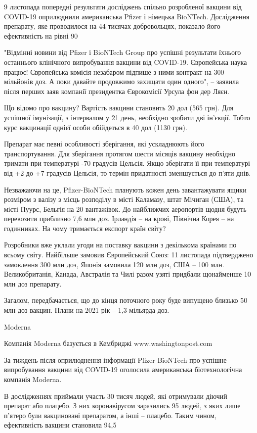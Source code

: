 9 листопада попередні результати досліджень спільно розробленої вакцини від COVID-19 оприлюднили американська Pfizer і німецька BioNTech. Дослідження препарату, яке проводилося на 44 тисячах добровольцях, показало його ефективність на рівні 90%

"Відмінні новини від Pfizer і BioNTech Group про успішні результати їхнього останнього клінічного випробування вакцини від COVID-19. Європейська наука працює! Європейська комісія незабаром підпише з ними контракт на 300 мільйонів доз. А поки давайте продовжимо захищати один одного", – заявила після перших заяв компанії президентка Єврокомісії Урсула фон дер Ляєн.

    Що відомо про вакцину? Вартість вакцини становить 20 дол (565 грн). Для успішної імунізації, з інтервалом у 21 день, необхідно зробити дві ін’єкції. Тобто курс вакцинації однієї особи обійдеться в 40 дол (1130 грн).

    Препарат має певні особливості зберігання, які ускладнюють його транспортування. Для зберігання протягом шести місяців вакцину необхідно тримати при температурі -70 градусів Цельсія. Якщо зберігати її при температурі від +2 до +7 градусів Цельсія, то термін придатності зменшується до п'яти днів.

Незважаючи на це, Pfizer-BioNTech планують кожен день завантажувати ящики розміром з валізу з місць розподілу в місті Каламазу, штат Мічиган (США), та місті Пуурс, Бельгія на 20 вантажівок. До найближчих аеропортів щодня будуть перевозити приблизно 7,6 млн доз.
Ірландія – на крові, Північна Корея – на годинниках. На чому тримається експорт країн світу?

Розробники вже уклали угоди на поставку вакцини з декількома країнами по всьому світу. Найбільше замовив Європейський Союз: 11 листопада підтверджено замовлення 300 млн доз, Японія замовила 120 млн доз, США – 100 млн. Великобританія, Канада, Австралія та Чилі разом узяті придбали щонайменше 10 млн доз препарату.

    Загалом, передбачається, що до кінця поточного року буде випущено близько 50 млн доз вакцин. Плани на 2021 рік – 1,3 мільярда доз.

Moderna
 
Компанія Moderna базується в Кембриджі
www.washingtonpost.com

За тиждень після оприлюднення інформації Pfizer-BioNTech про успішне випробування вакцини від COVID-19 оголосила американська біотехнологічна компанія Moderna.

В дослідженнях приймали участь 30 тисяч людей, які отримували діючий препарат або плацебо. З них коронавірусом заразились 95 людей, з яких лише п'ятеро були вакциновані препаратом, а інші – плацебо. Таким чином, ефективність вакцини становила 94,5%

